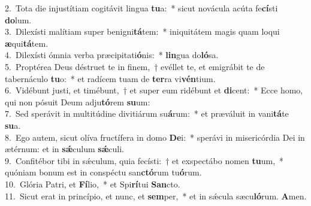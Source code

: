 {2.~}Tota die injustítiam cogitávit lingua \textbf{tu}a:~* sicut novácula acúta fe\textbf{cí}sti \textbf{do}lum.\\
{3.~}Dilexísti malítiam super benigni\textbf{tá}tem:~* iniquitátem magis quam loqui \textbf{æ}qui\textbf{tá}tem.\\
{4.~}Dilexísti ómnia verba præcipitati\textbf{ó}nis:~* \textbf{lin}gua do\textbf{ló}sa.\\
{5.~}Proptérea Deus déstruet te in finem,~† evéllet te, et emigrábit te de tabernáculo \textbf{tu}o:~* et radícem tuam de \textbf{ter}ra vi\textbf{vén}tium.\\
{6.~}Vidébunt justi, et timébunt,~† et super eum ridébunt et \textbf{di}cent:~* Ecce homo, qui non pósuit Deum adju\textbf{tó}rem \textbf{su}um:\\
{7.~}Sed sperávit in multitúdine divitiárum su\textbf{á}rum:~* et præváluit in vani\textbf{tá}te \textbf{su}a.\\
{8.~}Ego autem, sicut olíva fructífera in domo \textbf{De}i:~* sperávi in misericórdia Dei in ætérnum: et in \textbf{sǽ}culum \textbf{sǽ}culi.\\
{9.~}Confitébor tibi in sǽculum, quia fecísti:~† et exspectábo nomen \textbf{tu}um,~* quóniam bonum est in conspéctu san\textbf{ctó}rum tu\textbf{ó}rum.\\
{10.~}Glória Patri, et \textbf{Fí}lio,~* et Spi\textbf{rí}tui \textbf{San}cto.\\
{11.~}Sicut erat in princípio, et nunc, et \textbf{sem}per,~* et in sǽcula sæcu\textbf{ló}rum. \textbf{A}men.\\
